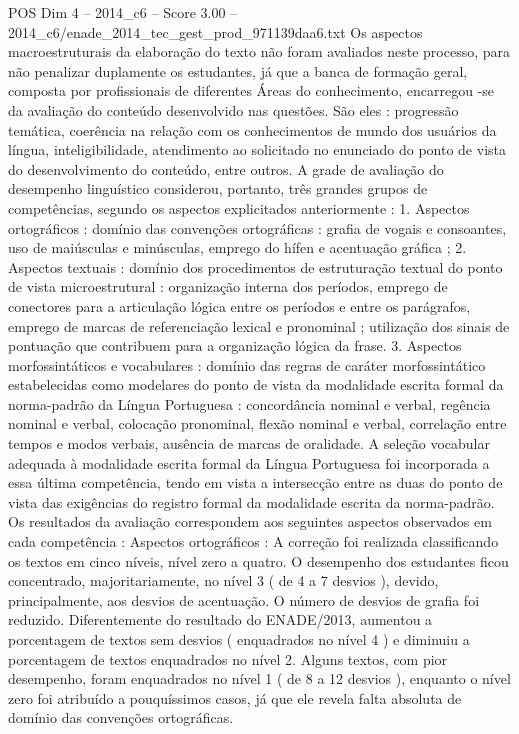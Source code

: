 \begin{textsample}{POS Dim 4 – 2014\_c6 – Score 3.00 – 2014\_c6/enade\_2014\_tec\_gest\_prod\_971139daa6.txt}
Os aspectos macroestruturais da elaboração do texto não foram avaliados neste processo, para não penalizar duplamente os estudantes, já que a banca de formação geral, composta por profissionais de diferentes Áreas do conhecimento, encarregou -se da avaliação do conteúdo desenvolvido nas questões.
São eles : progressão temática, coerência na relação com os conhecimentos de mundo dos usuários da língua, inteligibilidade, atendimento ao solicitado no enunciado do ponto de vista do desenvolvimento do conteúdo, entre outros.
A grade de avaliação do desempenho linguístico considerou, portanto, três grandes grupos de competências, segundo os aspectos explicitados anteriormente : 1.
Aspectos ortográficos : domínio das convenções ortográficas : grafia de vogais e consoantes, uso de maiúsculas e minúsculas, emprego do hífen e acentuação gráfica ; 2.
Aspectos textuais : domínio dos procedimentos de estruturação textual do ponto de vista microestrutural : organização interna dos períodos, emprego de conectores para a articulação lógica entre os períodos e entre os parágrafos, emprego de marcas de referenciação lexical e pronominal ; utilização dos sinais de pontuação que contribuem para a organização lógica da frase. 3.
Aspectos morfossintáticos e vocabulares : domínio das regras de caráter morfossintático estabelecidas como modelares do ponto de vista da modalidade escrita formal da norma-padrão da Língua Portuguesa : concordância nominal e verbal, regência nominal e verbal, colocação pronominal, flexão nominal e verbal, correlação entre tempos e modos verbais, ausência de marcas de oralidade.
A seleção vocabular adequada à modalidade escrita formal da Língua Portuguesa foi incorporada a essa última competência, tendo em vista a intersecção entre as duas do ponto de vista das exigências do registro formal da modalidade escrita da norma-padrão.
Os resultados da avaliação correspondem aos seguintes aspectos observados em cada competência : Aspectos ortográficos : A correção foi realizada classificando os textos em cinco níveis, nível zero a quatro.
O desempenho dos estudantes ficou concentrado, majoritariamente, no nível 3 ( de 4 a 7 desvios ), devido, principalmente, aos desvios de acentuação.
O número de desvios de grafia foi reduzido.
Diferentemente do resultado do ENADE/2013, aumentou a porcentagem de textos sem desvios ( enquadrados no nível 4 ) e diminuiu a porcentagem de textos enquadrados no nível 2.
Alguns textos, com pior desempenho, foram enquadrados no nível 1 ( de 8 a 12 desvios ), enquanto o nível zero foi atribuído a pouquíssimos casos, já que ele revela falta absoluta de domínio das convenções ortográficas.

\end{textsample}
